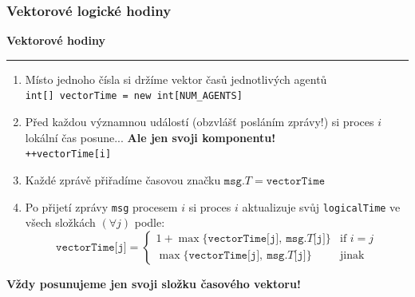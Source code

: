 \documentclass[usenames,dvipsnames,9pt]{beamer}
\begin{document}
\begin{frame}
  \frametitle{Vektorové logické hodiny}

  \begin{center}
    \LARGE \bf Vektorové hodiny
  \end{center}

  \vspace{1em}\hrule\vspace{1em}

  \begin{enumerate}
    \pause\item Místo jednoho čísla si držíme vektor časů jednotlivých agentů \\
  	            \texttt{int[] vectorTime = new int[NUM_AGENTS]}
  	\pause\item Před každou významnou událostí (obzvlášť posláním zprávy!) si proces $i$ lokální čas posune... \textbf{Ale jen svoji komponentu!} \\
  				\texttt{++vectorTime[i]}
  	\pause\item Každé zprávě přiřadíme časovou značku $\texttt{msg.}T = \texttt{vectorTime}$
  	\pause\item Po přijetí zprávy \texttt{msg} procesem $i$ si proces $i$ aktualizuje svůj \texttt{logicalTime} ve všech složkách $(\forall j)$ podle:
  				\[ \texttt{vectorTime[j]} = \begin{cases}
  				      1 + \max \lbrace \texttt{vectorTime[j]},\ \texttt{msg.}T\texttt{[j]} \rbrace & \text{if } i = j \\
  				      \max \lbrace \texttt{vectorTime[j]},\ \texttt{msg.}T\texttt{[j]} \rbrace & \text{jinak}
  				   \end{cases}
  				\]
  \end{enumerate}

  \pause
  \begin{center}
  	\bf \faWarning \hspace{3pt} Vždy posunujeme jen svoji složku časového vektoru!
  \end{center}



\end{frame}
\end{document}
